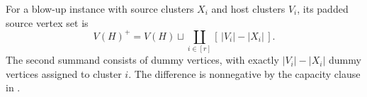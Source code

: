 \begin{definition}
For a blow-up instance with source clusters $X_i$ and host clusters $V_i$, its padded source vertex set is
\[
 V(H)^+=V(H)\sqcup\coprod_{i\in[r]}[\,|V_i|-|X_i|\,].
\]
The second summand consists of dummy vertices, with exactly $|V_i|-|X_i|$ dummy vertices assigned to cluster $i$.  The difference is nonnegative by the capacity clause in .
\end{definition}
